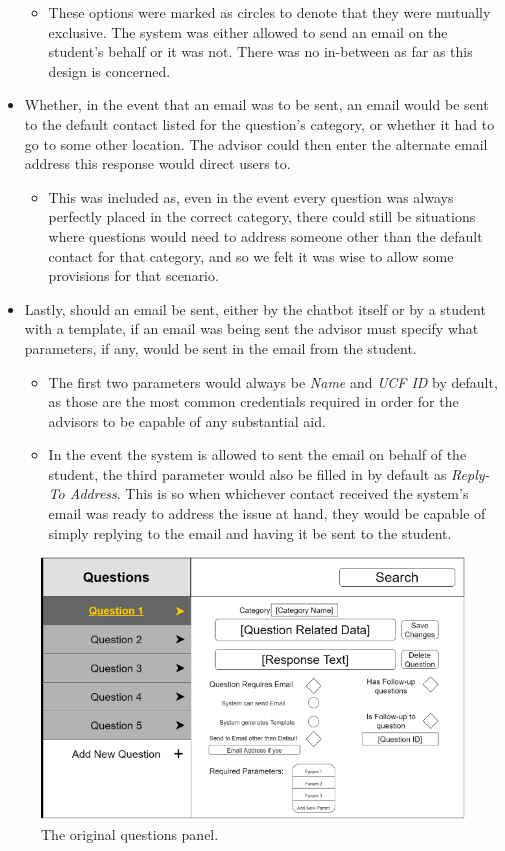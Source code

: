\documentclass[titlepage, 12pt]{article}
\begin{document}
\begin{itemize}
\begin{itemize}
        \item These options were marked as circles to denote that they were mutually exclusive. The system was either allowed to send an email on the student’s behalf or it was not. There was no in-between as far as this design is concerned.
    \end{itemize}
    \item Whether, in the event that an email was to be sent, an email would be sent to the default contact listed for the question’s category, or whether it had to go to some other location. The advisor could then enter the alternate email address this response would direct users to.
    \begin{itemize}
        \item This was included as, even in the event every question was always perfectly placed in the correct category, there could still be situations where questions would need to address someone other than the default contact for that category, and so we felt it was wise to allow some provisions for that scenario.
    \end{itemize}
    \item Lastly, should an email be sent, either by the chatbot itself or by a student with a template, if an email was being sent the advisor must specify what parameters, if any, would be sent in the email from the student.
    \begin{itemize}
        \item The first two parameters would always be \emph{Name} and \emph{UCF ID} by default, as those are the most common credentials required in order for the advisors to be capable of any substantial aid.
        \item In the event the system is allowed to sent the email on behalf of the student, the third parameter would also be filled in by default as \emph{Reply-To Address}. This is so when whichever contact received the system’s email was ready to address the issue at hand, they would be capable of simply replying to the email and having it be sent to the student.
    \end{itemize}
\end{itemize}

\begin{figure}[h]
    \centering\includegraphics[width=0.75\linewidth]{images/original-questions-panel.png}
    \caption{The original questions panel.}
\end{figure}
\end{document}
